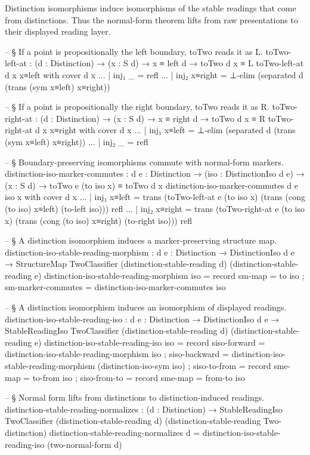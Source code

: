 \documentclass[11pt]{article}
\begin{document}
Distinction isomorphisms induce isomorphisms of the stable readings that
come from distinctions.  Thus the normal-form theorem lifts from raw
presentations to their displayed reading layer.

\begin{code}
-- § If a point is propositionally the left boundary, toTwo reads it as L.
toTwo-left-at :
  (d : Distinction) → (x : S d) → x ≡ left d → toTwo d x ≡ L
toTwo-left-at d x x≡left with cover d x
... | inj₁ _ = refl
... | inj₂ x≡right = ⊥-elim (separated d (trans (sym x≡left) x≡right))

-- § If a point is propositionally the right boundary, toTwo reads it as R.
toTwo-right-at :
  (d : Distinction) → (x : S d) → x ≡ right d → toTwo d x ≡ R
toTwo-right-at d x x≡right with cover d x
... | inj₁ x≡left = ⊥-elim (separated d (trans (sym x≡left) x≡right))
... | inj₂ _ = refl

-- § Boundary-preserving isomorphisms commute with normal-form markers.
distinction-iso-marker-commutes :
  {d e : Distinction} →
  (iso : DistinctionIso d e) →
  (x : S d) → toTwo e (to iso x) ≡ toTwo d x
distinction-iso-marker-commutes {d} {e} iso x with cover d x
... | inj₁ x≡left =
  trans
    (toTwo-left-at e (to iso x) (trans (cong (to iso) x≡left) (to-left iso)))
    refl
... | inj₂ x≡right =
  trans
    (toTwo-right-at e (to iso x) (trans (cong (to iso) x≡right) (to-right iso)))
    refl

-- § A distinction isomorphism induces a marker-preserving structure map.
distinction-iso-stable-reading-morphism :
  {d e : Distinction} →
  DistinctionIso d e →
  StructureMap TwoClassifier (distinction-stable-reading d) (distinction-stable-reading e)
distinction-iso-stable-reading-morphism iso = record
  { sm-map             = to iso
  ; sm-marker-commutes = distinction-iso-marker-commutes iso
  }

-- § A distinction isomorphism induces an isomorphism of displayed readings.
distinction-iso-stable-reading-iso :
  {d e : Distinction} →
  DistinctionIso d e →
  StableReadingIso TwoClassifier (distinction-stable-reading d) (distinction-stable-reading e)
distinction-iso-stable-reading-iso iso = record
  { siso-forward  = distinction-iso-stable-reading-morphism iso
  ; siso-backward = distinction-iso-stable-reading-morphism (distinction-iso-sym iso)
  ; siso-to-from  = record { sme-map = to-from iso }
  ; siso-from-to  = record { sme-map = from-to iso }
  }

-- § Normal form lifts from distinctions to distinction-induced readings.
distinction-stable-reading-normalizes :
  (d : Distinction) →
  StableReadingIso TwoClassifier
    (distinction-stable-reading d)
    (distinction-stable-reading Two-distinction)
distinction-stable-reading-normalizes d =
  distinction-iso-stable-reading-iso (two-normal-form d)
\end{code}
\end{document}
